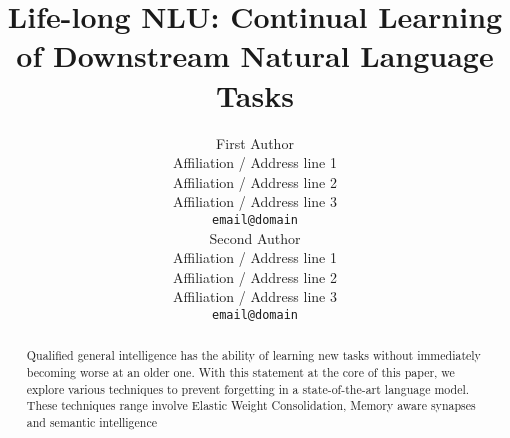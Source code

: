 \documentclass[11pt,a4paper]{article}
\title{Life-long NLU: Continual Learning of Downstream Natural Language Tasks}
\author{First Author \\
  Affiliation / Address line 1 \\
  Affiliation / Address line 2 \\
  Affiliation / Address line 3 \\
  {\tt email@domain} \\\And
  Second Author \\
  Affiliation / Address line 1 \\
  Affiliation / Address line 2 \\
  Affiliation / Address line 3 \\
  {\tt email@domain} \\}
\date{}
\begin{document}
\maketitle
\begin{abstract}
  Qualified general intelligence has the ability of learning new tasks without immediately becoming worse at an older one. With this statement at the core of this paper, we explore various techniques to prevent forgetting in a state-of-the-art language model. These techniques range involve Elastic Weight Consolidation, Memory aware synapses and semantic intelligence \cite{french1999catastrophic}
\end{abstract}










\end{document}
